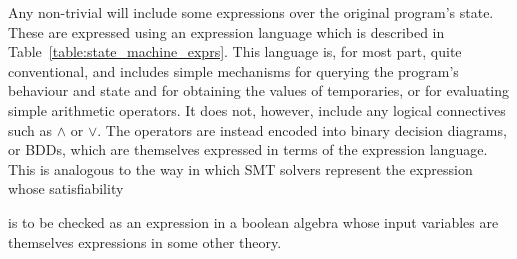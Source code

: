 Any non-trivial {\StateMachine} will include some expressions over the
original program's state.  These are expressed using an expression
language which is described in Table~\ref{table:state_machine_exprs}.
This language is, for most part, quite conventional, and includes
simple mechanisms for querying the program's behaviour and state and
for obtaining the values of {\StateMachine} temporaries, or for
evaluating simple arithmetic operators.  It does not, however, include
any logical connectives such as $\wedge$ or $\vee$.  The operators are
instead encoded into binary decision diagrams, or
BDDs\cite{Brace1990}, which are themselves expressed in terms of the
expression language.  This is analogous to the way in which SMT
solvers represent the expression whose satisfiability
is to be checked as an expression in a boolean algebra whose input
variables are themselves expressions in some other theory.

